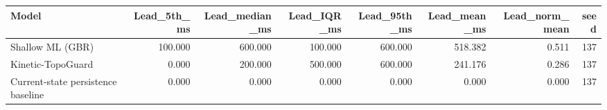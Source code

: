 \begin{tabular}{lrrrrrrr}
\toprule
Model & Lead\_5th\_ms & Lead\_median\_ms & Lead\_IQR\_ms & Lead\_95th\_ms & Lead\_mean\_ms & Lead\_norm\_mean & seed \\
\midrule
Shallow ML (GBR) & 100.000 & 600.000 & 100.000 & 600.000 & 518.382 & 0.511 & 137 \\
Kinetic-TopoGuard & 0.000 & 200.000 & 500.000 & 600.000 & 241.176 & 0.286 & 137 \\
Current-state persistence baseline & 0.000 & 0.000 & 0.000 & 0.000 & 0.000 & 0.000 & 137 \\
\bottomrule
\end{tabular}